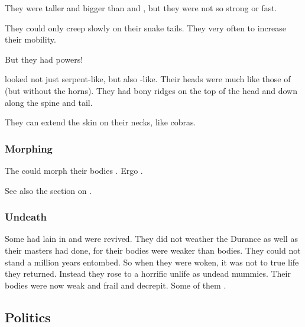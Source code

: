 They were taller and bigger than \humans{} and \scathae, but they were not so strong or fast. 

They could only creep slowly on their snake tails. 
They very often  to increase their mobility. 

But they had  powers! 

\Ophidians looked not just serpent-like, but also \dragon-like. 
Their heads were much like those of \dragons (but without the horns). 
They had bony ridges on the top of the head and down along the spine and tail. 

They can extend the skin on their necks, like cobras. 





\subsubsection{Morphing}
The \quiljaaran could morph their bodies . 
Ergo . 

See also the section on . 





\subsubsection{Undeath}
Some \ophidians had lain in  and were revived.
They did not weather the Durance as well as their \draconian masters had done, for their \ophidian bodies were weaker than \draconian bodies.
They could not stand a million years entombed. 
So when they were woken, it was not to true life they returned.
Instead they rose to a horrific unlife as undead mummies. 
Their bodies were now weak and frail and decrepit. 
Some of them .









\subsection{Politics}





